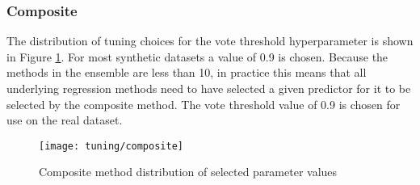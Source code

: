 \subsubsection{Composite}
The distribution of tuning choices for the vote threshold hyperparameter is shown in Figure \ref{fig:tun_composite}. For most synthetic datasets a value of 0.9 is chosen. Because the methods in the ensemble are less than 10, in practice this means that all underlying regression methods need to have selected a given predictor for it to be selected by the composite method. The vote threshold value of 0.9 is chosen for use on the real dataset.
\begin{figure}[H]
	\centering
	\texttt{[image: tuning/composite]}
	\caption{Composite method distribution of selected parameter values}
	\label{fig:tun_composite}
\end{figure}
